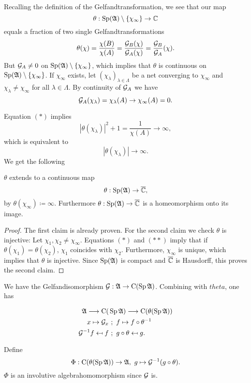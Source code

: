 Recalling the definition of the Gelfandtransformation, we see that our map
\[
 \theta : \operatorname{Sp}(\mathfrak{A}) \setminus \left\lbrace\chi_\infty\right\rbrace \to \mathbb{C}
\]
equals a fraction of two single Gelfandtransformations
\[
 \theta(\chi) = \frac{\chi(B)}{\chi(A)} = \frac{\mathcal{G}_B (\chi)}{\mathcal{G}_A (\chi)}=
 \frac{\mathcal{G}_B}{\mathcal{G}_A}(\chi).
\]
But $\mathcal{G}_A \neq 0$ on $\operatorname{Sp}(\mathfrak{A}) \setminus \left\lbrace\chi_\infty\right\rbrace$, which implies
that $\theta$ is continuous on $\operatorname{Sp}(\mathfrak{A}) \setminus \left\lbrace\chi_\infty\right\rbrace$.
If $\chi_\infty$ exists, let $ \left( \chi_\lambda \right) 
_{\lambda \in \Lambda}$ be a net converging to $\chi_\infty$ and 
$\chi_\lambda \neq \chi_\infty$ for all $\lambda \in \Lambda$. 
By continuity of $\mathcal{G}_A$ we have
\[
 \mathcal{G}_A (\chi_\lambda) = \chi_\lambda (A) \to \chi_\infty (A) = 0.
\]

Equation $(\ast)$ implies
\[
 | \theta( \chi_\lambda ) | ^2  + 1 = \frac{1}{\chi(A)} \to \infty,
\]
which is equivalent to 
\[
 | \theta (\chi_\lambda ) | \to \infty.
\]
We get the following 
\begin{lem}
$\theta$ extends to a continuous map
\[
 \theta : \operatorname{Sp}(\mathfrak{A}) \to {\overline{\mathbb{C}}},
\]
by $\theta (\chi_\infty) \coloneqq \infty$.
Furthermore $\theta : \operatorname{Sp} (\mathfrak{A}) \to {\overline{\mathbb{C}}}$ is a homeomorphism onto its image.
\end{lem}

\begin{proof}
The first claim is already proven. For the second claim we check 
$\theta$ is injective:
Let $\chi_1 , \chi_2 \neq \chi_\infty$. Equations $(\ast)$ and $(\ast \ast)$
imply that if $\theta (\chi_1)= \theta( \chi_2)$, \newline $\chi_1$ coincides with
$\chi_2$. Furthermore, $\chi_\infty$ is unique, which implies that $\theta$
is injective. Since $\operatorname{Sp} (\mathfrak{A})$ is compact and ${\overline{\mathbb{C}}}$ is Hausdorff, 
this proves the second claim.
\end{proof}

We have the Gelfandisomorphism $\mathcal{G} : \mathfrak{A} \to \operatorname{C} (\operatorname{Sp} \mathfrak{A})$. 
Combining with $theta$, one has

\begin{align*}
 \mathfrak{A} \longrightarrow  \operatorname{C} (&\operatorname{Sp} \mathfrak{A}) \longrightarrow  \operatorname{C} (\theta ( \operatorname{Sp} \mathfrak{A} )) \\
 x \mapsto  \mathcal{G}_x &~;~ f \mapsto  f \circ \theta ^{-1} \\
 \mathcal{G} ^{-1} f \mapsfrom f &~;~ g \circ \theta \mapsfrom g.
\end{align*}

Define
\[
 \Phi : \operatorname{C} ( \theta (\operatorname{Sp} \mathfrak{A})) \to \mathfrak{A},~ g \mapsto \mathcal{G} ^{-1} (g \circ \theta).
\]
$\Phi$ is an involutive algebrahomomorphism since $\mathcal{G}$ is.

